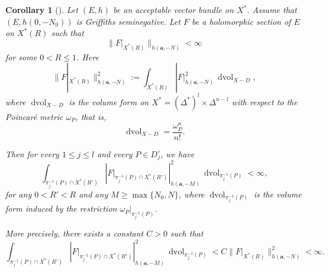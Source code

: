\documentclass[12pt,twoside]{amsart}
\DeclareMathOperator{\dvol}{dvol}
\newtheorem{cor}[thm]{Corollary}
\theoremstyle{definition}
\begin{document}
\begin{cor}[{\cite[Corollary~21.2.5]{mochizuki4}}]\label{x-cor7.1}
Let $(E,h)$ be an acceptable vector bundle on $X^*$.  
Assume that $(E,h(0,-N_0))$ is Griffiths seminegative.  
Let $F$ be a holomorphic section of $E$ on $X^*(R)$ such that 
\[
\|F|_{X^*(R)}\|_{h(\bm{a},-N)} < \infty
\]
for some $0<R\leq 1$.  
Here
\[
\|F|_{X^*(R)}\|_{h(\bm{a},-N)}^2
:= \int_{X^*(R)} |F|_{h(\bm{a},-N)}^2 \, \dvol_{X-D},
\]
where $\dvol_{X-D}$ is the volume form on 
$X^*=(\Delta^*)^l\times \Delta^{n-l}$ with respect to the Poincaré metric $\omega_P$, 
that is, 
\[
\dvol _{X-D} =\frac{\omega^n_P}{n!}.
\]

Then for every $1 \le j \le l$ and every $P \in D_j^\circ$, we have
\[
\int_{\pi_j^{-1}(P)\cap X^*(R')}
\left| F|_{\pi_j^{-1}(P)\cap X^*(R')} \right|^2_{h(\bm{a},-M)}
\, \dvol_{\pi_j^{-1}(P)} < \infty,
\]
for any $0 < R' < R$ and any $M \ge \max\{N_0, N\}$,  
where $\dvol_{\pi_j^{-1}(P)}$ is the volume form induced by the restriction
$\omega_P|_{\pi_j^{-1}(P)}$.

More precisely, there exists a constant $C>0$ such that 
\[
\int_{\pi_j^{-1}(P)\cap X^*(R')}
\left| F|_{\pi_j^{-1}(P)\cap X^*(R')} \right|^2_{h(\bm{a},-M)}
\, \dvol_{\pi_j^{-1}(P)} < C\| F|_{X^*(R)}\|^2_{h(\bm a, -N)}<\infty. 
\]

\end{cor}
\end{document}
